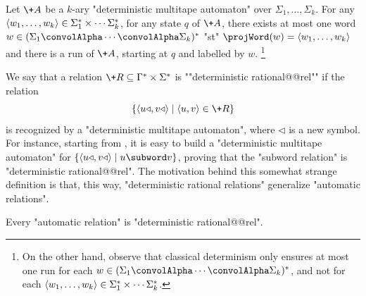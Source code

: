 \begin{claim}
	\label{claim:tool-deterministic-rational}
	Let $\+A$ be a $k$-ary "deterministic multitape automaton" over $\Sigma_1,\hdots,\Sigma_k$.
	For any $\langle w_1,\hdots,w_k\rangle \in \Sigma_1^* \times \cdots \Sigma_k^*$,
	for any state $q$ of $\+A$, there exists at most
	one word $w \in (\Sigma_1\convolAlpha\cdots\convolAlpha\Sigma_k)^*$ "st" $\projWord(w) = \tup{w_1,\hdots,w_k}$ and there is a run of $\+A$, starting at $q$ and labelled by $w$.%
	\footnote{On the other hand, observe that classical determinism only ensures
	at most one run for each $w \in (\Sigma_1\convolAlpha\cdots\convolAlpha\Sigma_k)^*$,
	and not for each $\langle w_1,\hdots,w_k\rangle \in \Sigma_1^* \times \cdots \Sigma_k^*$.}
\end{claim}

We say that a relation $\+R \subseteq \Gamma^* \times \Sigma^*$ is ""deterministic rational@@rel""
if the relation
\[
	\{\tup{u\triangleleft, v\triangleleft} \mid \tup{u,v} \in \+R\}
\]
is recognized by a "deterministic multitape automaton", where $\triangleleft$ is a new symbol.
For instance, starting from , it is easy
to build a "deterministic multitape automaton" for
$\{\tup{u\triangleleft, v\triangleleft} \mid u \subword v\}$,
proving that the "subword relation" is "deterministic rational@@rel".
The motivation behind this somewhat strange definition is that, this way,
"deterministic rational relations" generalize "automatic relations".

\begin{proposition}
	\AP\label{prop:synchronous-implies-detrat}
	Every "automatic relation" is "deterministic rational@@rel".
\end{proposition}

